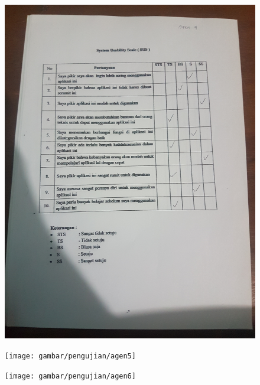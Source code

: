 \begin{figure}[H]
	\center
	\includegraphics [width = 17cm,angle=-90]{gambar/pengujian/agen4}
\end{figure}
\begin{figure}[H]
	\center
	\texttt{[image: gambar/pengujian/agen5]}
\end{figure}
\begin{figure}[H]
	\center
	\texttt{[image: gambar/pengujian/agen6]}
\end{figure}
